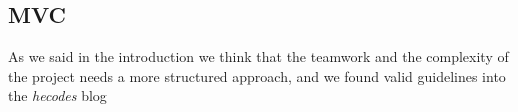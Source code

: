 \subsection{MVC}
As we said in the introduction we think that the teamwork and the complexity of the project needs a more structured approach, and we found valid guidelines into the \textit{hecodes} blog \cite{mvcarticle}